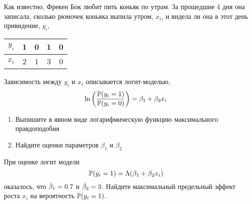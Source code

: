 \documentclass[pdftex,11pt,openany]{book}\usepackage[]{graphicx}\usepackage[]{color}
\begin{document}
\begin{problem}
Как известно, Фрекен Бок любит пить коньяк по утрам. За прошедшие 4 дня она записала, сколько рюмочек коньяка выпила утром, $x_i$, и видела ли она в этот день привидение, $y_i$, 

\begin{tabular}{c|cccc}
$y_i$ & 1 & 0 & 1 & 0 \\
\hline
$x_i$ & 2 & 1 & 3 & 0 
\end{tabular}  

Зависимость между $y_i$ и $x_i$ описывается логит-моделью, 
\[
\ln 
\left(
  \frac{\P(y_i=1)}{\P(y_i=0)}
\right)
=\beta_1+\beta_2 x_i
\]

\begin{enumerate}
\item Выпишите в явном виде логарифмическую функцию максимального правдоподобия
\item \useR Найдите оценки параметров $\beta_1$ и $\beta_2$
\end{enumerate}
\end{problem}
\begin{solution}
\end{solution}


\begin{problem}
При оценке логит модели 
\[
\P(y_i=1)=\Lambda(\b_1+\b_2 x_i)
\]
оказалось, что $\hb_1=0.7$ и $\hb_2=3$. Найдите максимальный предельный эффект роста $x_i$ на вероятность $\P(y_i=1)$.
\end{problem}
\begin{solution}
\end{solution}
\end{document}
